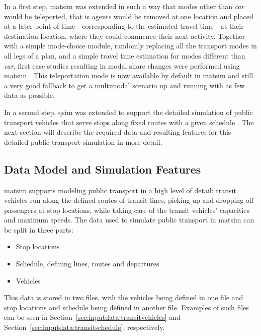 In a first step, \gls{matsim} was extended in such a way that modes other than
\emph{car} would be \gls{teleported}, that is agents would be removed at one location
and placed at a later point of time---corresponding to the estimated travel time---at
their destination location, where they could commence their next activity.
Together with a simple mode-choice module, randomly replacing all the
transport modes in all legs of a plan, and a simple travel time estimation for
modes different than \emph{car}, first case studies resulting in modal share
changes were performed using \gls{matsim}
\citep{RieserGretherNagel2008modeChoiceCalculations,
GretherEtAl2009SimpleModeChoiceIPL}. This \gls{teleportation} mode is now available by
default in \gls{matsim} and still a very good fallback to get a \gls{multimodal} scenario
up and running with as few data as possible.

In a second step, \gls{qsim} was extended to support the detailed simulation of
public transport vehicles that serve stops along fixed routes with a given schedule
\citep{Rieser2010}.
The next section will describe the required data and resulting features for this
detailed public transport simulation in more detail.

\subsection{Data Model and Simulation Features}
\gls{matsim} supports modeling public transport in a high level of detail: transit
vehicles run along the defined routes of transit lines, picking up
and dropping off passengers at stop locations, while taking care of the transit
vehicles' capacities and maximum speeds. The data used to simulate public
transport in \gls{matsim} can be split in three parts:
%
\begin{itemize}\styleItemize
\item Stop locations
\item Schedule, defining lines, routes and departures
\item Vehicles
\end{itemize}

This data is stored in two files, with the vehicles being defined in one
file and stop locations and schedule being defined in
another file.
Examples of such files can be seen in
Section~\ref{sec:inputdata:transitvehicles} and
Section~\ref{sec:inputdata:transitschedule}, respectively.

